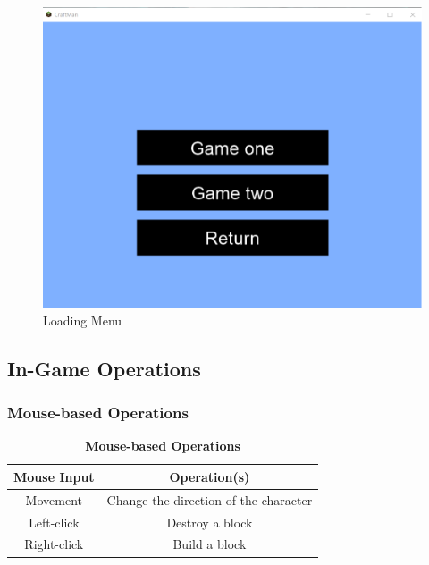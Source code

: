 \documentclass[12pt, titlepage]{article}
\begin{document}
\begin{figure}[h]
\centering
\includegraphics[scale=0.25]{loadingmenu}
\caption{Loading Menu}
\end{figure}
\FloatBarrier

\subsection{In-Game Operations}
\subsubsection{Mouse-based Operations}
\begin{table}[!htbp]
\centering
\begin{tabular}{ |c|c| }
\hline
 \textbf{Mouse Input} & \textbf{Operation(s)} \\ \hline
 Movement & Change the direction of the character \\ \hline
 Left-click & Destroy a block \\ \hline
 Right-click & Build a block \\ \hline
\end{tabular}
\caption{\textbf{Mouse-based Operations}}
\end{table}
\FloatBarrier
\end{document}
